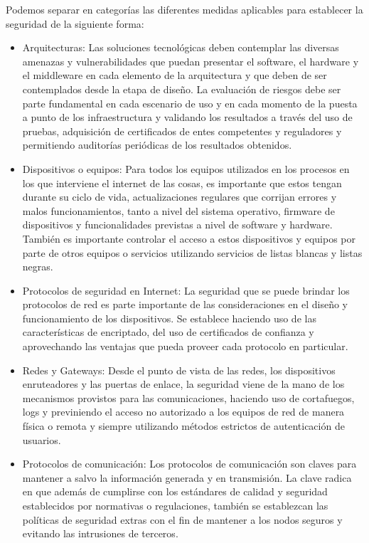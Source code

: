 Podemos separar en categorías las diferentes medidas aplicables para establecer la seguridad de la siguiente forma:

\begin{itemize}
\item Arquitecturas: Las soluciones tecnológicas deben contemplar las diversas amenazas y vulnerabilidades que puedan presentar el software, el hardware y el middleware en cada elemento de la arquitectura y que deben de ser contemplados desde la etapa de diseño. La evaluación de riesgos debe ser parte fundamental en cada escenario de uso y en cada momento de la puesta a punto de los infraestructura y validando los resultados a través del uso de pruebas, adquisición de certificados de entes competentes y reguladores y permitiendo auditorías periódicas de los resultados obtenidos.
\item Dispositivos o equipos: Para todos los equipos utilizados en los procesos en los que interviene el internet de las cosas, es importante que estos tengan durante su ciclo de vida, actualizaciones regulares que corrijan errores y malos funcionamientos, tanto a nivel del sistema operativo, firmware de dispositivos y funcionalidades previstas a nivel de software y hardware. También es importante controlar el acceso a estos dispositivos y equipos por parte de otros equipos o servicios utilizando servicios de listas blancas y listas negras.
\item Protocolos de seguridad en Internet: La seguridad que se puede brindar los protocolos de red es parte importante de las consideraciones en el diseño y funcionamiento de los dispositivos. Se establece haciendo uso de las características de encriptado, del uso de certificados de confianza y aprovechando las ventajas que pueda proveer cada protocolo en particular.  
\item Redes y Gateways: Desde el punto de vista de las redes, los dispositivos enruteadores y las puertas de enlace, la seguridad viene de la mano de los mecanismos provistos para las comunicaciones, haciendo uso de cortafuegos, logs y previniendo el acceso no autorizado a los equipos de red de manera física o remota y siempre utilizando métodos estrictos de autenticación de usuarios.
\item Protocolos de comunicación: Los protocolos de comunicación son claves para mantener a salvo la información generada y en transmisión. La clave radica en que además de cumplirse con los estándares de calidad y seguridad establecidos por normativas o regulaciones, también se establezcan las políticas de seguridad extras con el fin de mantener a los nodos seguros y evitando las intrusiones de terceros.

\end{itemize}
